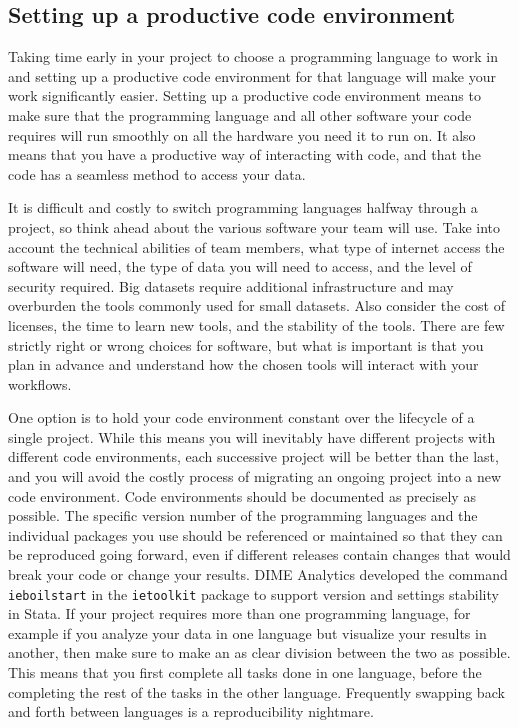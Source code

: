 \subsection{Setting up a productive code environment}

Taking time early in your project to choose a programming language to work in and
setting up a productive code environment for that language
will make your work significantly easier.
Setting up a productive code environment means to
make sure that the programming language and all other software your code requires
will run smoothly on all the hardware you need it to run on.
It also means that you have a productive way of interacting with code,
and that the code has a seamless method to access your data.

It is difficult and costly to switch programming languages halfway through a project,
so think ahead about the various software your team will use.
Take into account the technical abilities of team members,
what type of internet access the software will need,
the type of data you will need to access,
and the level of security required.
Big datasets require additional infrastructure and may overburden
the tools commonly used for small datasets.
Also consider the cost of licenses, the time to learn new tools,
and the stability of the tools.
There are few strictly right or wrong choices for software,
but what is important is that you plan in advance
and understand how the chosen tools will interact with your workflows.

One option is to hold your code environment constant
over the lifecycle of a single project.
While this means you will inevitably have different projects
with different code environments, each successive project will be better than the last,
and you will avoid the costly process of migrating an ongoing project
into a new code environment.
Code environments should be documented as precisely as possible.
The specific version number of the programming languages and the individual packages you use
should be referenced or maintained so that they can be reproduced going forward,
even if different releases contain changes that would break your code
or change your results.
DIME Analytics developed the command \texttt{ieboilstart} in the \texttt{ietoolkit} package
to support version and settings stability in Stata.
If your project requires more than one programming language,
for example if you analyze your data in one language but visualize your results in another,
then make sure to make an as clear division between the two as possible.
This means that you first complete all tasks done in one language,
before the completing the rest of the tasks in the other language.
Frequently swapping back and forth between languages is a reproducibility nightmare.

